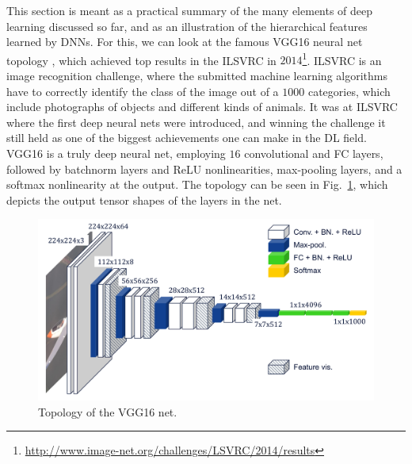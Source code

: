 			This section is meant as a practical summary of the many elements of deep learning discussed so far, and as an illustration of the hierarchical features learned by \acp{DNN}.
			For this, we can look at the famous VGG16 neural net topology \cite{vgg16}, which achieved top results in the \ac{ILSVRC} in $2014$\footnote{\url{http://www.image-net.org/challenges/LSVRC/2014/results}}.
			\ac{ILSVRC} is an image recognition challenge, where the submitted machine learning algorithms have to correctly identify the class of the image out of a $1000$ categories, which include photographs of objects and different kinds of animals.
			It was at \ac{ILSVRC} where the first deep neural nets were introduced, and winning the challenge it still held as one of the biggest achievements one can make in the \ac{DL} field. 
			VGG16 is a truly deep neural net, employing $16$ convolutional and \ac{FC} layers, followed by batchnorm layers and \ac{ReLU} nonlinearities, max-pooling layers, and a softmax nonlinearity at the output.
			The topology can be seen in Fig.~\ref{fig:vgg16_topo}, which depicts the output tensor shapes of the layers in the net.
			
			\begin{figure}[ht]
				\centering
				\includegraphics[width=\linewidth]{figures/02_deep_learning/vgg16_topo/vgg16_topo.pdf}
				\caption[VGG16 topology]{Topology of the VGG16 net.}
				\label{fig:vgg16_topo}
			\end{figure}
			
